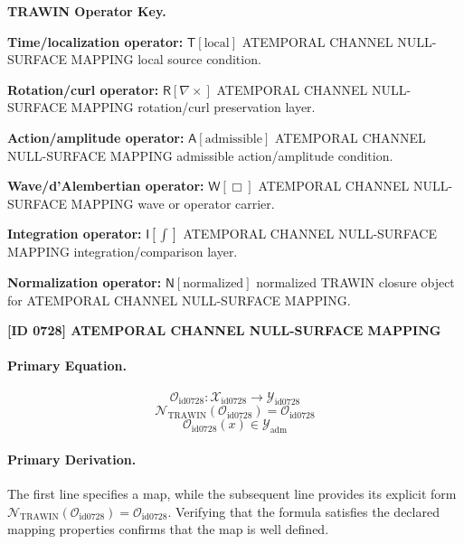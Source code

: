 \par\vspace{0.45\baselineskip}
\noindent\begin{minipage}[t]{\linewidth}
\begingroup
\small
\raggedright
\textbf{TRAWIN Operator Key.}\par
\noindent\textbf{Time/localization operator:} $\mathsf{T}\!\left[\mathrm{local}\right]$ ATEMPORAL CHANNEL NULL-SURFACE MAPPING local source condition.\par
\noindent\textbf{Rotation/curl operator:} $\mathsf{R}\!\left[\nabla\times\right]$ ATEMPORAL CHANNEL NULL-SURFACE MAPPING rotation/curl preservation layer.\par
\noindent\textbf{Action/amplitude operator:} $\mathsf{A}\!\left[\mathrm{admissible}\right]$ ATEMPORAL CHANNEL NULL-SURFACE MAPPING admissible action/amplitude condition.\par
\noindent\textbf{Wave/d'Alembertian operator:} $\mathsf{W}\!\left[\Box\right]$ ATEMPORAL CHANNEL NULL-SURFACE MAPPING wave or operator carrier.\par
\noindent\textbf{Integration operator:} $\mathsf{I}\!\left[\int\right]$ ATEMPORAL CHANNEL NULL-SURFACE MAPPING integration/comparison layer.\par
\noindent\textbf{Normalization operator:} $\mathsf{N}\!\left[\mathrm{normalized}\right]$ normalized TRAWIN closure object for ATEMPORAL CHANNEL NULL-SURFACE MAPPING.\par
\endgroup
\end{minipage}

\clearpage
\noindent\textbf{[ID 0728] ATEMPORAL CHANNEL NULL-SURFACE MAPPING}\par
\vspace{0.35em}
\paragraph{Primary Equation.}
\[
\mathcal{O}_{\mathrm{id0728}}:\mathcal{X}_{\mathrm{id0728}}\longrightarrow\mathcal{Y}_{\mathrm{id0728}}
\]
\[
\mathcal{N}_{\mathrm{TRAWIN}}(\mathcal{O}_{\mathrm{id0728}})=\mathcal{O}_{\mathrm{id0728}}
\]
\[
\mathcal{O}_{\mathrm{id0728}}(x)\in\mathcal{Y}_{\mathrm{adm}}
\]

\paragraph{Primary Derivation.}
The first line specifies a map, while the subsequent line provides its explicit form \( \mathcal{N}_{\mathrm{TRAWIN}}(\mathcal{O}_{\mathrm{id0728}})=\mathcal{O}_{\mathrm{id0728}} \). Verifying that the formula satisfies the declared mapping properties confirms that the map is well defined.
